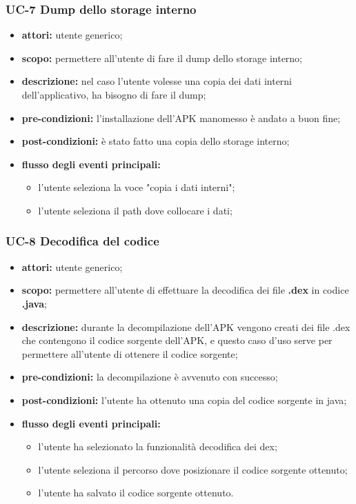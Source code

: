 \subsubsection{UC-7 Dump dello storage interno}\label{subsubsec:uc-6-dump-dello-storage-interno}
\begin{itemize}
    \item \textbf{attori:} utente generico;
    \item \textbf{scopo:} permettere all'utente di fare il dump dello storage interno;
    \item \textbf{descrizione:} nel caso l'utente volesse una copia dei dati interni dell'applicativo, ha bisogno di fare il dump;
    \item \textbf{pre-condizioni:} l'installazione dell'APK manomesso è andato a buon fine;
    \item \textbf{post-condizioni:} è stato fatto una copia dello storage interno;
    \item \textbf{flusso degli eventi principali:}
    \begin{itemize}
        \item l'utente seleziona la voce "copia i dati interni";
        \item l'utente seleziona il path dove collocare i dati;
    \end{itemize}
\end{itemize}
\subsubsection{UC-8 Decodifica del codice}\label{subsubsec:uc-8-decodifica-del-codice}
\begin{itemize}
    \item \textbf{attori:} utente generico;
    \item \textbf{scopo:} permettere all'utente di effettuare la decodifica dei file \textbf{.dex} in codice \textbf{.java};
    \item \textbf{descrizione:} durante la decompilazione dell'APK vengono creati dei file .dex che contengono il codice sorgente dell'APK, e questo caso d'uso serve per permettere all'utente di ottenere il codice sorgente;
    \item \textbf{pre-condizioni:} la decompilazione è avvenuto con successo;
    \item \textbf{post-condizioni:} l'utente ha ottenuto una copia del codice sorgente in java;
    \item \textbf{flusso degli eventi principali:}
    \begin{itemize}
        \item l'utente ha selezionato la funzionalità decodifica dei dex;
        \item l'utente seleziona il percorso dove posizionare il codice sorgente ottenuto;
        \item l'utente ha salvato il codice sorgente ottenuto.
    \end{itemize}
\end{itemize}
